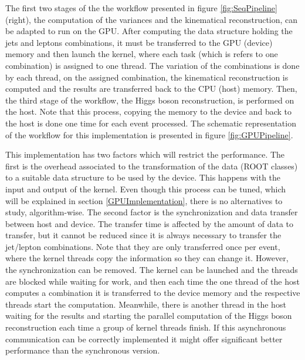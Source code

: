 The first two stages of the the workflow presented in figure \ref{fig:SeqPipeline} (right), the computation of the variances and the kinematical reconstruction, can be adapted to run on the GPU. After computing the data structure holding the jets and leptons combinations, it must be transferred to the GPU (device) memory and then launch the kernel, where each task (which is refers to one combination) is assigned to one thread. The variation of the combinations is done by each thread, on the assigned combination, the kinematical reconstruction is computed and the results are transferred back to the CPU (host) memory. Then, the third stage of the workflow, the Higgs boson reconstruction, is performed on the host. Note that this process, copying the memory to the device and back to the host is done one time for each event processed. The schematic representation of the workflow for this implementation is presented in figure \ref{fig:GPUPipeline}.

This implementation has two factors which will restrict the performance. The first is the overhead associated to the transformation of the data (ROOT classes) to a suitable data structure to be used by the device. This happens with the input and output of the kernel. Even though this process can be tuned, which will be explained in section \ref{GPUImplementation}, there is no alternatives to study, algorithm-wise. The second factor is the synchronization and data transfer between host and device. The transfer time is affected by the amount of data to transfer, but it cannot be reduced since it is always necessary to transfer the jet/lepton combinations. Note that they are only transferred once per event, where the kernel threads copy the information so they can change it. However, the synchronization can be removed. The kernel can be launched and the threads are blocked while waiting for work, and then each time the one thread of the host computes a combination it is transferred to the device memory and the respective threads start the computation. Meanwhile, there is another thread in the host waiting for the results and starting the parallel computation of the Higgs boson reconstruction each time a group of kernel threads finish. If this asynchronous communication can be correctly implemented it might offer significant better performance than the synchronous version.